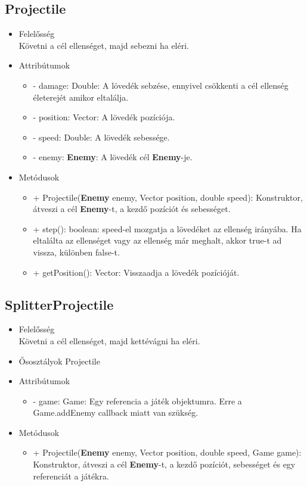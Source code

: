 \subsection{Projectile}
\begin{itemize}
\item Felelősség\\
Követni a cél ellenséget, majd sebezni ha eléri.
\item Attribútumok
	\begin{itemize}
		\item - damage: Double: A lövedék sebzése, ennyivel csökkenti a cél ellenség életerejét amikor eltalálja.
		\item - position: Vector: A lövedék pozíciója.
		\item - speed: Double: A lövedék sebessége.
		\item - enemy: \textbf{Enemy}: A lövedék cél \textbf{Enemy}-je.
	\end{itemize}
\item Metódusok
	\begin{itemize}
		\item + Projectile(\textbf{Enemy} enemy, Vector position, double speed): Konstruktor, átveszi a cél \textbf{Enemy}-t, a kezdő pozíciót és sebességet.
		\item + step(): boolean: speed-el mozgatja a lövedéket az ellenség irányába. Ha eltalálta az ellenséget vagy az ellenség már meghalt, akkor true-t ad vissza, különben false-t.
		\item + getPosition(): Vector: Visszaadja a lövedék pozícióját.
	\end{itemize}
\end{itemize}

\subsection{SplitterProjectile}
\begin{itemize}
\item Felelősség\\
Követni a cél ellenséget, majd kettévágni ha eléri.
\item Ősosztályok\newline
Projectile
\item Attribútumok
	\begin{itemize}
		\item - game: Game: Egy referencia a játék objektumra. Erre a Game.addEnemy callback miatt van szükség.
	\end{itemize}
\item Metódusok
	\begin{itemize}
		\item + Projectile(\textbf{Enemy} enemy, Vector position, double speed, Game game): Konstruktor, átveszi a cél \textbf{Enemy}-t, a kezdő pozíciót, sebességet és egy referenciát a játékra.
	\end{itemize}
\end{itemize}

